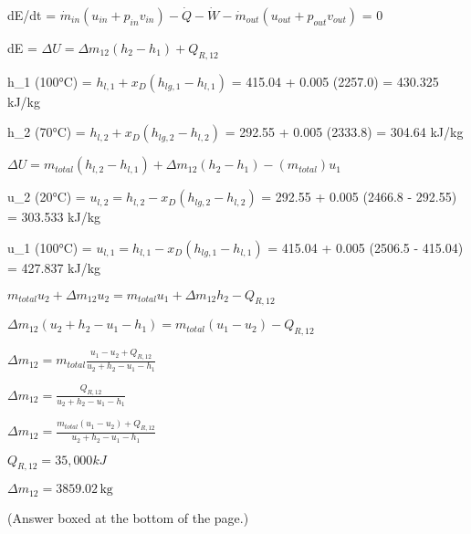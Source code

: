 dE/dt = \( \dot{m}_{in} (u_{in} + p_{in}v_{in}) - \dot{Q} - \dot{W} - \dot{m}_{out} (u_{out} + p_{out}v_{out}) \) = 0  

dE = \( \Delta U = \Delta m_{12} (h_2 - h_1) + Q_{R,12} \)  

h_1 (100°C) = \( h_{l,1} + x_D (h_{lg,1} - h_{l,1}) \)  
= 415.04 + 0.005 (2257.0)  
= 430.325 kJ/kg  

h_2 (70°C) = \( h_{l,2} + x_D (h_{lg,2} - h_{l,2}) \)  
= 292.55 + 0.005 (2333.8)  
= 304.64 kJ/kg  

\( \Delta U = m_{total} (h_{l,2} - h_{l,1}) + \Delta m_{12} (h_2 - h_1) - (m_{total}) u_1 \)  

u_2 (20°C) = \( u_{l,2} = h_{l,2} - x_D (h_{lg,2} - h_{l,2}) \)  
= 292.55 + 0.005 (2466.8 - 292.55)  
= 303.533 kJ/kg  

u_1 (100°C) = \( u_{l,1} = h_{l,1} - x_D (h_{lg,1} - h_{l,1}) \)  
= 415.04 + 0.005 (2506.5 - 415.04)  
= 427.837 kJ/kg  

\( m_{total} u_2 + \Delta m_{12} u_2 = m_{total} u_1 + \Delta m_{12} h_2 - Q_{R,12} \)  

\( \Delta m_{12} (u_2 + h_2 - u_1 - h_1) = m_{total} (u_1 - u_2) - Q_{R,12} \)  

\( \Delta m_{12} = m_{total} \frac{u_1 - u_2 + Q_{R,12}}{u_2 + h_2 - u_1 - h_1} \)  

\( \Delta m_{12} = \frac{Q_{R,12}}{u_2 + h_2 - u_1 - h_1} \)  

\( \Delta m_{12} = \frac{m_{total} (u_1 - u_2) + Q_{R,12}}{u_2 + h_2 - u_1 - h_1} \)  

\( Q_{R,12} = 35,000 kJ \)  

\( \Delta m_{12} = 3859.02 \, \text{kg} \)  

(Answer boxed at the bottom of the page.)
